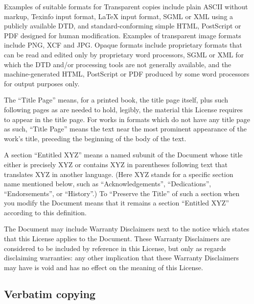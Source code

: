 {\tiny{}Examples of suitable formats for Transparent copies include
plain ASCII without markup, Texinfo input format, \LaTeX{} input format,
SGML or XML using a publicly available DTD, and standard-conforming
simple HTML, PostScript or PDF designed for human modification. Examples
of transparent image formats include PNG, XCF and JPG. Opaque formats
include proprietary formats that can be read and edited only by proprietary
word processors, SGML or XML for which the DTD and/or processing tools
are not generally available, and the machine-generated HTML, PostScript
or PDF produced by some word processors for output purposes only.}{\tiny\par}

{\tiny{}The \textsf{``}Title Page\textsf{''} means, for a printed book, the title
page itself, plus such following pages as are needed to hold, legibly,
the material this License requires to appear in the title page. For
works in formats which do not have any title page as such, \textquotedblleft Title
Page\textquotedblright{} means the text near the most prominent appearance
of the work\textsf{'}s title, preceding the beginning of the body of the text.}{\tiny\par}

{\tiny{}A section \textsf{``}Entitled XYZ\textsf{''} means a named subunit of the
Document whose title either is precisely XYZ or contains XYZ in parentheses
following text that translates XYZ in another language. (Here XYZ
stands for a specific section name mentioned below, such as \textquotedblleft Acknowledgements\textquotedblright ,
\textquotedblleft Dedications\textquotedblright , \textquotedblleft Endorsements\textquotedblright ,
or \textquotedblleft History\textquotedblright .) To \textquotedblleft Preserve
the Title\textquotedblright{} of such a section when you modify the
Document means that it remains a section \textquotedblleft Entitled
XYZ\textquotedblright{} according to this definition.}{\tiny\par}

{\tiny{}The Document may include Warranty Disclaimers next to the
notice which states that this License applies to the Document. These
Warranty Disclaimers are considered to be included by reference in
this License, but only as regards disclaiming warranties: any other
implication that these Warranty Disclaimers may have is void and has
no effect on the meaning of this License.}{\tiny\par}

\subsection{Verbatim copying\label{subsec:2Verbatim-copying}}

